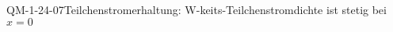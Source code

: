 
\begin{CONC}{QM-1-24-07}{Teilchenstromerhaltung: W-keits-Teilchenstromdichte ist stetig bei $x=0$}
\end{CONC}
